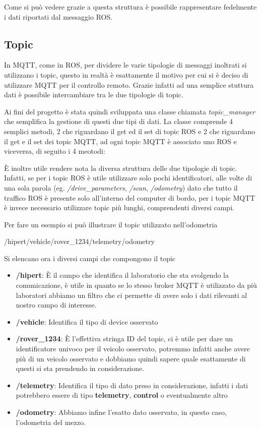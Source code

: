 \noindent Come si può vedere grazie a questa struttura è possibile rappresentare fedelmente i dati riportati dal messaggio ROS.

\subsection{Topic}
In MQTT, come in ROS, per dividere le varie tipologie di messaggi inoltrati si utilizzano i topic, questo in realtà è esattamente il motivo per cui si è deciso di utilizzare MQTT per il controllo remoto. Grazie infatti ad una semplice stuttura dati è possibile intercambiare tra le due tipologie di topic.

\noindent Ai fini del progetto è stata quindi sviluppata una classe chiamata \textit{topic\_manager} che semplifica la gestione di questi due tipi di dati. La classe comprende 4 semplici metodi, 2 che riguardano il get ed il set di topic ROS e 2 che riguardano il get e il set dei topic MQTT, ad ogni topic MQTT è associato uno ROS e viceversa, di seguito i 4 meotodi:



\noindent È inoltre utile rendere nota la diversa struttura delle due tipologie di topic. Infatti, se per i topic ROS è utile utilizzare solo pochi identificatori, alle volte di una sola parola (eg. \textit{/drive\_parameters}, \textit{/scan}, \textit{/odometry}) dato che tutto il traffico ROS è presente solo all'interno del computer di bordo, per i topic MQTT è invece necessario utilizzare topic più lunghi, comprendenti diversi campi.

\noindent Per fare un esempio si può illustrare il topic utilizzato nell'odometria

\begin{center}
  /hipert/vehicle/rover\_1234/telemetry/odometry
\end{center}

\noindent Si elencano ora i diversi campi che compongono il topic

\begin{itemize}
  \item \textbf{/hipert}: È il campo che identifica il laboratorio che sta svolgendo la comunicazione, è utile in quanto se lo stesso broker MQTT è utilizzato da più laboratori abbiamo un filtro che ci permette di avere solo i dati rilevanti al nostro campo di interesse.
  \item \textbf{/vehicle}: Identifica il tipo di device osservato
  \item \textbf{/rover\_1234}: È l'effettiva stringa ID del topic, ci è utile per dare un identificatore univoco per il veicolo osservato, potremmo infatti anche avere più di un veicolo osservato e dobbiamo quindi sapere quale esattamente di questi si sta prendendo in considerazione.
  \item \textbf{/telemetry}: Identifica il tipo di dato preso in considerazione, infatti i dati potrebbero essere di tipo \textbf{telemetry}, \textbf{control} o eventualmente altro
  \item \textbf{/odometry}: Abbiamo infine l'esatto dato osservato, in questo caso, l'odometria del mezzo.
\end{itemize}
